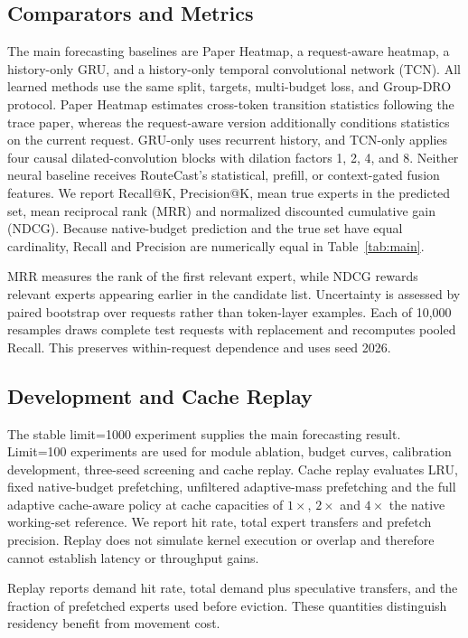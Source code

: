 \documentclass[conference]{IEEEtran}
\begin{document}
\subsection{Comparators and Metrics}
The main forecasting baselines are Paper Heatmap, a request-aware heatmap, a history-only GRU, and a history-only temporal convolutional network (TCN). All learned methods use the same split, targets, multi-budget loss, and Group-DRO protocol. Paper Heatmap estimates cross-token transition statistics following the trace paper, whereas the request-aware version additionally conditions statistics on the current request. GRU-only uses recurrent history, and TCN-only applies four causal dilated-convolution blocks with dilation factors 1, 2, 4, and 8. Neither neural baseline receives RouteCast's statistical, prefill, or context-gated fusion features. We report Recall@K, Precision@K, mean true experts in the predicted set, mean reciprocal rank (MRR) and normalized discounted cumulative gain (NDCG). Because native-budget prediction and the true set have equal cardinality, Recall and Precision are numerically equal in Table~\ref{tab:main}.

MRR measures the rank of the first relevant expert, while NDCG rewards relevant experts appearing earlier in the candidate list. Uncertainty is assessed by paired bootstrap over requests rather than token-layer examples. Each of 10,000 resamples draws complete test requests with replacement and recomputes pooled Recall. This preserves within-request dependence and uses seed 2026.

\subsection{Development and Cache Replay}
The stable limit=1000 experiment supplies the main forecasting result. Limit=100 experiments are used for module ablation, budget curves, calibration development, three-seed screening and cache replay. Cache replay evaluates LRU, fixed native-budget prefetching, unfiltered adaptive-mass prefetching and the full adaptive cache-aware policy at cache capacities of $1\times$, $2\times$ and $4\times$ the native working-set reference. We report hit rate, total expert transfers and prefetch precision. Replay does not simulate kernel execution or overlap and therefore cannot establish latency or throughput gains.

Replay reports demand hit rate, total demand plus speculative transfers, and the fraction of prefetched experts used before eviction. These quantities distinguish residency benefit from movement cost.
\end{document}
